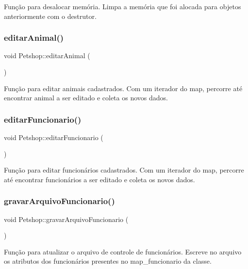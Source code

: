 Função para desalocar memória. Limpa a memória que foi alocada para objetos anteriormente com o destrutor. \mbox{\label{classPetshop_aeb3366966b03bbe1ed6fd5065147b4fa}} 
\subsubsection{\texorpdfstring{editar\+Animal()}{editarAnimal()}}
{\footnotesize\ttfamily void Petshop\+::editar\+Animal (\begin{DoxyParamCaption}{ }\end{DoxyParamCaption})}

Função para editar animais cadastrados. Com um iterador do map, percorre até encontrar animal a ser editado e coleta os novos dados. \mbox{\label{classPetshop_afffa95f1248cdf9999c40b16d469af2a}} 
\subsubsection{\texorpdfstring{editar\+Funcionario()}{editarFuncionario()}}
{\footnotesize\ttfamily void Petshop\+::editar\+Funcionario (\begin{DoxyParamCaption}{ }\end{DoxyParamCaption})}

Função para editar funcionários cadastrados. Com um iterador do map, percorre até encontrar funcionários a ser editado e coleta os novos dados. \mbox{\label{classPetshop_aead26f84cad6db0a70e75112ba3fe58d}} 
\subsubsection{\texorpdfstring{gravar\+Arquivo\+Funcionario()}{gravarArquivoFuncionario()}}
{\footnotesize\ttfamily void Petshop\+::gravar\+Arquivo\+Funcionario (\begin{DoxyParamCaption}{ }\end{DoxyParamCaption})}

Função para atualizar o arquivo de controle de funcionários. Escreve no arquivo os atributos dos funcionários presentes no map\+\_\+funcionario da classe. \mbox{\label{classPetshop_a5b18b5e2667f00547486ec1f01a4f639}} 
